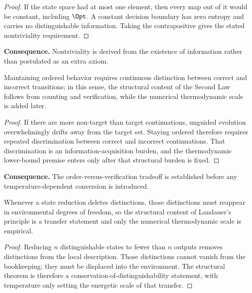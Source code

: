\begin{proof}
If the state space had at most one element, then every map out of it would be constant, including $\Opt$. A constant decision boundary has zero entropy and carries no distinguishable information. Taking the contrapositive gives the stated nontriviality requirement.
\end{proof}

\noindent\textbf{Consequence.} Nontriviality is derived from the existence of information rather than postulated as an extra axiom.

\begin{theorem}\label{thm:second-law-counting}
Maintaining ordered behavior requires continuous distinction between correct and incorrect transitions; in this sense, the structural content of the Second Law follows from counting and verification, while the numerical thermodynamic scale is added later.
\end{theorem}

\begin{proof}
If there are more non-target than target continuations, unguided evolution overwhelmingly drifts away from the target set. Staying ordered therefore requires repeated discrimination between correct and incorrect continuations. That discrimination is an information-acquisition burden, and the thermodynamic lower-bound premise enters only after that structural burden is fixed.
\end{proof}

\noindent\textbf{Consequence.} The order-versus-verification tradeoff is established before any temperature-dependent conversion is introduced.

\begin{theorem}\label{thm:landauer-structure}
Whenever a state reduction deletes distinctions, those distinctions must reappear in environmental degrees of freedom, so the structural content of Landauer's principle is a transfer statement and only the numerical thermodynamic scale is empirical.
\end{theorem}

\begin{proof}
Reducing $n$ distinguishable states to fewer than $n$ outputs removes distinctions from the local description. Those distinctions cannot vanish from the bookkeeping; they must be displaced into the environment. The structural theorem is therefore a conservation-of-distinguishability statement, with temperature only setting the energetic scale of that transfer.
\end{proof}

